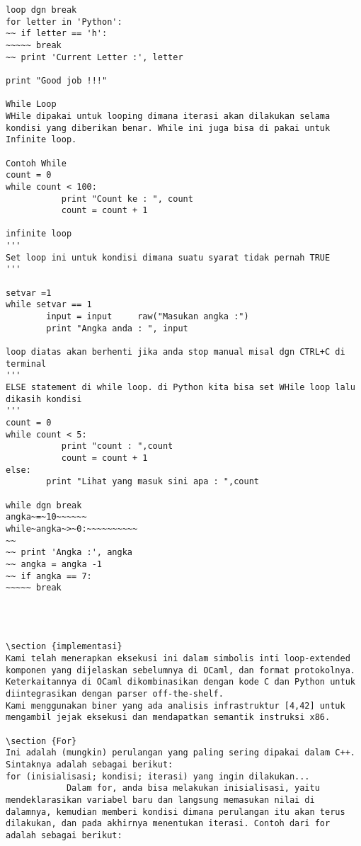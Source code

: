 \begin{verbatim}
loop dgn break 
for letter in 'Python': 
~~ if letter == 'h': 
~~~~~ break 
~~ print 'Current Letter :', letter 

print "Good job !!!" 

While Loop 
WHile dipakai untuk looping dimana iterasi akan dilakukan selama kondisi yang diberikan benar. While ini juga bisa di pakai untuk Infinite loop. 

Contoh While 
count = 0 
while count < 100: 
           print "Count ke : ", count 
           count = count + 1 

infinite loop 
''' 
Set loop ini untuk kondisi dimana suatu syarat tidak pernah TRUE 
''' 

setvar =1 
while setvar == 1 
        input = input     raw("Masukan angka :") 
        print "Angka anda : ", input 

loop diatas akan berhenti jika anda stop manual misal dgn CTRL+C di terminal 
''' 
ELSE statement di while loop. di Python kita bisa set WHile loop lalu dikasih kondisi 
''' 
count = 0 
while count < 5: 
           print "count : ",count 
           count = count + 1 
else: 
        print "Lihat yang masuk sini apa : ",count 

while dgn break 
angka~=~10~~~~~~    
while~angka~>~0:~~~~~~~~~~     
~~  
~~ print 'Angka :', angka 
~~ angka = angka -1 
~~ if angka == 7: 
~~~~~ break 




\section {implementasi}
Kami telah menerapkan eksekusi ini dalam simbolis inti loop-extended komponen yang dijelaskan sebelumnya di OCaml, dan format protokolnya. 
Keterkaitannya di OCaml dikombinasikan dengan kode C dan Python untuk diintegrasikan dengan parser off-the-shelf. 
Kami menggunakan biner yang ada analisis infrastruktur [4,42] untuk mengambil jejak eksekusi dan mendapatkan semantik instruksi x86.

\section {For}
Ini adalah (mungkin) perulangan yang paling sering dipakai dalam C++. Sintaknya adalah sebagai berikut:
for (inisialisasi; kondisi; iterasi) yang ingin dilakukan...
            Dalam for, anda bisa melakukan inisialisasi, yaitu mendeklarasikan variabel baru dan langsung memasukan nilai di dalamnya, kemudian memberi kondisi dimana perulangan itu akan terus dilakukan, dan pada akhirnya menentukan iterasi. Contoh dari for adalah sebagai berikut:


\end{verbatim}
